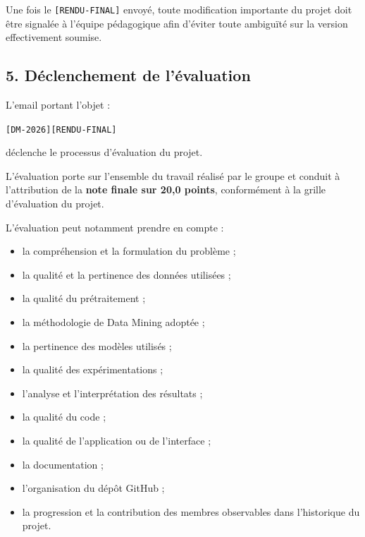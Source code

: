 \documentclass[11pt,a4paper]{article}
\begin{document}
\begin{tcolorbox}[
    colback=sintefblue!8,
    colframe=sintefblue,
    title=\textbf{DIRECTIVES OFFICIELLES DE COMMUNICATION, DE SUIVI ET DE RENDU},
    arc=2mm,
    boxrule=0.8pt,
    breakable
]
Une fois le \texttt{[RENDU-FINAL]} envoyé, toute modification importante du
projet doit être signalée à l'équipe pédagogique afin d'éviter toute ambiguïté
sur la version effectivement soumise.

\subsection*{5. Déclenchement de l'évaluation}

L'email portant l'objet :

\begin{center}
    \texttt{[DM-2026][RENDU-FINAL]}
\end{center}

déclenche le processus d'évaluation du projet.

L'évaluation porte sur l'ensemble du travail réalisé par le groupe et conduit
à l'attribution de la \textbf{note finale sur 20,0 points}, conformément à la
grille d'évaluation du projet.

L'évaluation peut notamment prendre en compte :

\begin{itemize}
    \item la compréhension et la formulation du problème ;
    \item la qualité et la pertinence des données utilisées ;
    \item la qualité du prétraitement ;
    \item la méthodologie de Data Mining adoptée ;
    \item la pertinence des modèles utilisés ;
    \item la qualité des expérimentations ;
    \item l'analyse et l'interprétation des résultats ;
    \item la qualité du code ;
    \item la qualité de l'application ou de l'interface ;
    \item la documentation ;
    \item l'organisation du dépôt GitHub ;
    \item la progression et la contribution des membres observables dans
          l'historique du projet.
\end{itemize}

\end{tcolorbox}

\end{document}
